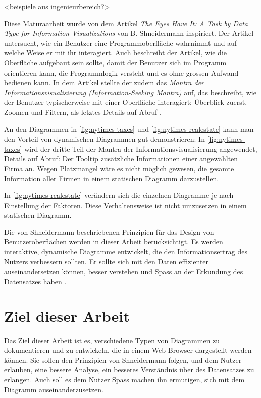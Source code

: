 <beispiele aus ingenieurbereich?>

Diese Maturaarbeit wurde von dem Artikel \textit{The Eyes Have It: A Task by Data Type for Information Visualizations} von B. Shneidermann \cite{shneiderman} inspiriert. Der Artikel untersucht, wie ein Benutzer eine Programmoberfläche wahrnimmt und auf welche Weise er mit ihr interagiert. Auch beschreibt der Artikel, wie die Oberfläche aufgebaut sein sollte, damit der Benutzer sich im Programm orientieren kann, die Programmlogik versteht und es ohne grossen Aufwand bedienen kann. In dem Artikel stellte der zudem das \textit{Mantra der Informationsvisualisierung (Information-Seeking Mantra)} auf, das beschreibt, wie der Benutzer typischerweise mit einer Oberfläche interagiert: Überblick zuerst, Zoomen und Filtern, als letztes Details auf Abruf \cite{shneiderman}.

An den Diagrammen in \ref{fig:nytimes-taxes} und \ref{fig:nytimes-realestate} kann man den Vorteil von dynamischen Diagrammen gut demonstrieren: In \ref{fig:nytimes-taxes} wird der dritte Teil der Mantra der Informationsvisualisierung angewendet, Details auf Abruf: Der Tooltip zusätzliche Informationen einer angewählten Firma an. Wegen Platzmangel wäre es nicht möglich gewesen, die gesamte Information aller Firmen in einem statischen Diagramm darzustellen.

In \ref{fig:nytimes-realestate} verändern sich die einzelnen Diagramme je nach Einstellung der Faktoren. Diese Verhaltensweise ist nicht umzusetzen in einem statischen Diagramm.

Die von Shneidermann beschriebenen Prinzipien für das Design von Benutzeroberflächen werden in dieser Arbeit berücksichtigt. Es werden interaktive, dynamische Diagramme entwickelt, die den Informationsertrag des Nutzers verbessern sollten. Er sollte sich mit den Daten effizienter auseinandersetzen können, besser verstehen und Spass an der Erkundung des Datensatzes haben \cite{shneiderman}.

\section{Ziel dieser Arbeit}

Das Ziel dieser Arbeit ist es, verschiedene Typen von Diagrammen zu dokumentieren und zu entwickeln, die in einem Web-Browser dargestellt werden können. Sie sollen den Prinzipien von Shneidermann folgen, und dem Nutzer erlauben, eine bessere Analyse, ein besseres Verständnis über des Datensatzes zu erlangen. Auch soll es dem Nutzer Spass machen ihn ermutigen, sich mit dem Diagramm auseinanderzusetzen.

